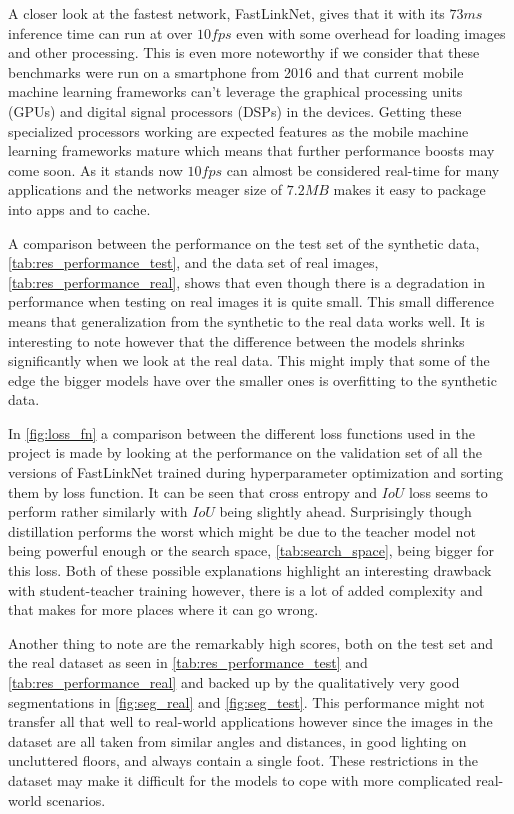 \documentclass{kththesis}
\begin{document}
A closer look at the fastest network, FastLinkNet, gives that it with its \(73
ms\) inference time can run at over \(10 fps\) even with some overhead for
loading images and other processing. This is even more noteworthy if we consider
that these benchmarks were run on a smartphone from 2016 and that current mobile
machine learning frameworks can't leverage the graphical processing units (GPUs)
and digital signal processors (DSPs) in the devices. Getting these specialized
processors working are expected features as the mobile machine learning
frameworks mature which means that further performance boosts may come soon. As
it stands now \(10 fps\) can almost be considered real-time for many
applications and the networks meager size of \(7.2 MB\) makes it easy to package
into apps and to cache.

A comparison between the performance on the test set of the synthetic data,
\cref{tab:res_performance_test}, and the data set of real images,
\cref{tab:res_performance_real}, shows that even though there is a
degradation in performance when testing on real images it is quite small. This
small difference means that generalization from the synthetic to the real data
works well. It is interesting to note however that the difference between the
models shrinks significantly when we look at the real data. This might imply
that some of the edge the bigger models have over the smaller ones is
overfitting to the synthetic data.

In \cref{fig:loss_fn} a comparison between the different loss functions used in
the project is made by looking at the performance on the validation set of all
the versions of FastLinkNet trained during hyperparameter optimization and
sorting them by loss function. It can be seen that cross entropy and \(IoU\)
loss seems to perform rather similarly with \(IoU\) being slightly ahead.
Surprisingly though distillation performs the worst which might be due to the
teacher model not being powerful enough or the search space,
\cref{tab:search_space}, being bigger for this loss. Both of these possible
explanations highlight an interesting drawback with student-teacher training
however, there is a lot of added complexity and that makes for more places where
it can go wrong.

Another thing to note are the remarkably high scores, both on the test set
and the real dataset as seen in \cref{tab:res_performance_test} and
\cref{tab:res_performance_real} and backed up by the qualitatively very good
segmentations in \cref{fig:seg_real} and \cref{fig:seg_test}. This performance
might not transfer all that well to real-world applications however since the
images in the dataset are all taken from similar angles and distances, in good
lighting on uncluttered floors, and always contain a single foot. These
restrictions in the dataset may make it difficult for the models to cope with
more complicated real-world scenarios.
\end{document}

